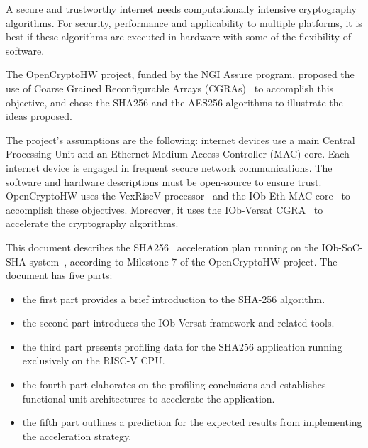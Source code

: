 A secure and trustworthy internet needs computationally intensive cryptography
algorithms. For security, performance and applicability to multiple platforms,
it is best if these algorithms are executed in hardware with some of the
flexibility of software.

The OpenCryptoHW project, funded by the NGI Assure program, proposed the use of
Coarse Grained Reconfigurable Arrays (CGRAs)~\cite{CGRA:Overview} to accomplish
this objective, and chose the SHA256 and the AES256 algorithms to illustrate
the ideas proposed.

The project's assumptions are the following: internet devices use a main
Central Processing Unit and an Ethernet Medium Access Controller (MAC) core.
Each internet device is engaged in frequent secure network communications. The
software and hardware descriptions must be open-source to ensure trust. 
OpenCryptoHW uses the VexRiscV processor~\cite{VexRiscv} and the IOb-Eth MAC
core~\cite{iob-eth} to accomplish these objectives. Moreover, it uses the
IOb-Versat CGRA~\cite{iob-versat} to accelerate the cryptography algorithms.

This document describes the SHA256~\cite{SHA_NIST_FIPS} acceleration plan
running on the IOb-SoC-SHA system~\cite{iob-soc-opencryptohw}, according to Milestone 7
of the OpenCryptoHW project. The document has five parts:
\begin{itemize}
\item the first part provides a brief introduction to the SHA-256 algorithm.
\item the second part introduces the IOb-Versat framework and related tools.
\item the third part presents profiling data for the SHA256 application
    running exclusively on the RISC-V CPU.
\item the fourth part elaborates on the profiling conclusions and establishes
    functional unit architectures to accelerate the application.
\item the fifth part outlines a prediction for the expected results from
    implementing the acceleration strategy.
\end{itemize}









